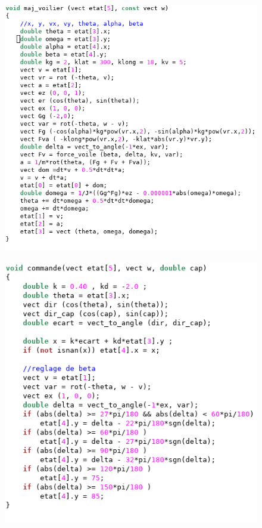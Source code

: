 \documentclass{beamer}
\begin{document}
\begin{frame}[plain]
\begin{figure}
\includegraphics[scale=0.35]{sim3.png} 
\end{figure}
\end{frame}

\begin{frame}[plain]
\begin{figure}
\includegraphics[scale=0.35]{sim4.png} 
\end{figure}
\end{frame}
\end{document}
